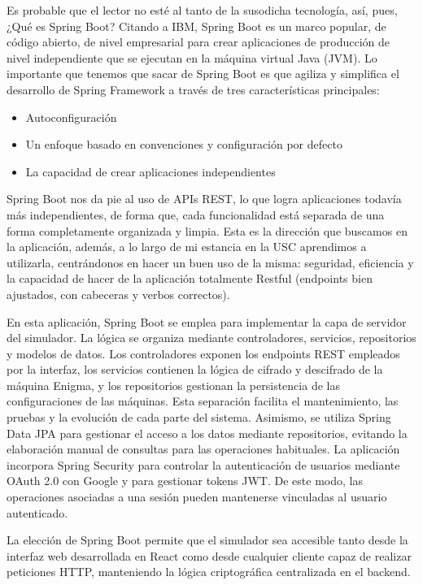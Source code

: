 Es probable que el lector no esté al tanto de la susodicha tecnología, así, pues, ¿Qué es Spring Boot? Citando a IBM, Spring Boot es un marco popular, de código abierto, de nivel empresarial para crear aplicaciones de producción de nivel independiente que se ejecutan en la máquina virtual Java (JVM). Lo importante que tenemos que sacar de Spring Boot es que agiliza y simplifica el desarrollo de Spring Framework a través de tres características principales:
\begin{itemize}
	\item Autoconfiguración
	\item Un enfoque basado en convenciones y configuración por defecto
	\item La capacidad de crear aplicaciones independientes
\end{itemize}

Spring Boot nos da pie al uso de APIs REST, lo que logra aplicaciones todavía más independientes, de forma que, cada funcionalidad está separada de una forma completamente organizada y limpia. Esta es la dirección que buscamos en la aplicación, además, a lo largo de mi estancia en la USC aprendimos a utilizarla, centrándonos en hacer un buen uso de la misma: seguridad, eficiencia y la capacidad de hacer de la aplicación totalmente Restful (endpoints bien ajustados, con cabeceras y verbos correctos).

En esta aplicación, Spring Boot se emplea para implementar la capa de servidor del simulador. La lógica se organiza mediante controladores, servicios, repositorios y modelos de datos. Los controladores exponen los endpoints REST empleados por la interfaz, los servicios contienen la lógica de cifrado y descifrado de la máquina Enigma, y los repositorios gestionan la persistencia de las configuraciones de las máquinas. Esta separación facilita el mantenimiento, las pruebas y la evolución de cada parte del sistema.
Asimismo, se utiliza Spring Data JPA para gestionar el acceso a los datos mediante repositorios, evitando la elaboración manual de consultas para las operaciones habituales. La aplicación incorpora Spring Security para controlar la autenticación de usuarios mediante OAuth 2.0 con Google y para gestionar tokens JWT. De este modo, las operaciones asociadas a una sesión pueden mantenerse vinculadas al usuario autenticado.

La elección de Spring Boot permite que el simulador sea accesible tanto desde la interfaz web desarrollada en React como desde cualquier cliente capaz de realizar peticiones HTTP, manteniendo la lógica criptográfica centralizada en el backend.

